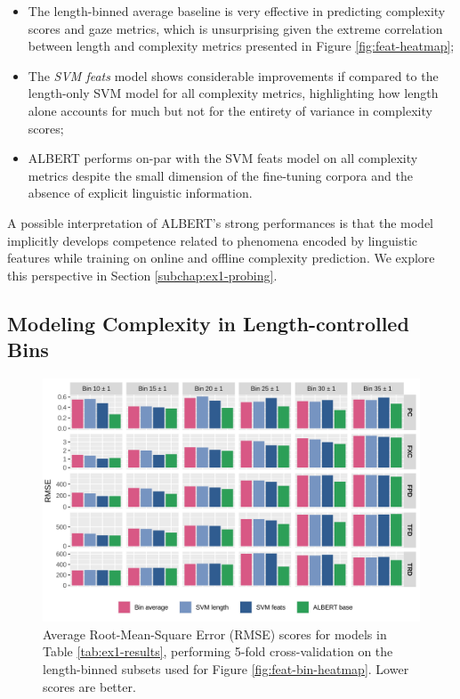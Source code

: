 \documentclass[a4paper, nobind]{templates/ociamthesis}
\begin{document}
\begin{itemize}
\item
  The length-binned average baseline is very effective in predicting complexity scores and gaze metrics, which is unsurprising given the extreme correlation between length and complexity metrics presented in Figure \ref{fig:feat-heatmap};
\item
  The \emph{SVM feats} model shows considerable improvements if compared to the length-only SVM model for all complexity metrics, highlighting how length alone accounts for much but not for the entirety of variance in complexity scores;
\item
  ALBERT performs on-par with the SVM feats model on all complexity metrics despite the small dimension of the fine-tuning corpora and the absence of explicit linguistic information.
\end{itemize}

A possible interpretation of ALBERT's strong performances is that the model implicitly develops competence related to phenomena encoded by linguistic features while training on online and offline complexity prediction. We explore this perspective in Section \ref{subchap:ex1-probing}.

\hypertarget{subsubchap:ex1-modeling-bins}{%
\subsection{Modeling Complexity in Length-controlled Bins}\label{subsubchap:ex1-modeling-bins}}



\begin{figure}

{\centering \includegraphics[width=1\linewidth]{figures/3_models_bin_scores} 

}

\caption{Average Root-Mean-Square Error (RMSE) scores for models in Table \ref{tab:ex1-results}, performing 5-fold cross-validation on the length-binned subsets used for Figure \ref{fig:feat-bin-heatmap}. Lower scores are better.}\label{fig:models-bin-scores}
\end{figure}
\end{document}
